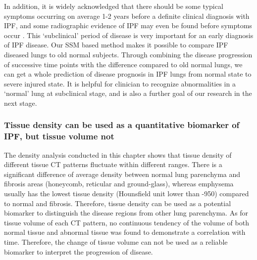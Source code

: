 In addition, it is widely acknowledged that there should be some typical symptoms occurring on average 1-2 years before a definite clinical diagnosis with IPF, and some radiographic evidence of IPF may even be found before symptoms occur \citep{raghu2011official, devaraj2014imaging}. This ‘subclinical’ period of disease is very important for an early diagnosis of IPF disease. Our SSM based method makes it possible to compare IPF diseased lungs to old normal subjects. Through combining the disease progression of successive time points with the difference compared to old normal lungs, we can get a whole prediction of disease prognosis in IPF lungs from normal state to severe injured state. It is helpful for clinician to recognize abnormalities in a ‘normal’ lung at subclinical stage, and is also a further goal of our research in the next stage. 

\subsubsection{Tissue density can be used as a quantitative biomarker of IPF, but tissue volume not}
The density analysis conducted in this chapter shows that tissue density of different tissue CT patterns fluctuate within different ranges. There is a significant difference of average density between normal lung parenchyma and fibrosis areas (honeycomb, reticular and ground-glass), whereas emphysema usually has the lowest tissue density (Hounsfield unit lower than -950) compared to normal and fibrosis. Therefore, tissue density can be used as a potential biomarker to distinguish the disease regions from other lung parenchyma. As for tissue volume of each CT pattern, no continuous tendency of the volume of both normal tissue and abnormal tissue was found to demonstrate a correlation with time. Therefore, the change of tissue volume can not be used as a reliable biomarker to interpret the progression of disease.

